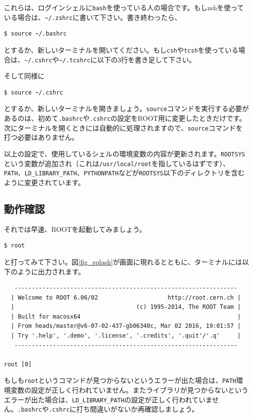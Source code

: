 これらは、ログインシェルに\texttt{bash}を使っている人の場合です。もしzshを使っている場合は、\texttt{\~{}/.zshrc}に書いて下さい。書き終わったら、
\begin{lstlisting}[language=bash]
$ source ~/.bashrc
\end{lstlisting}
とするか、新しいターミナルを開いてください。もし\texttt{csh}や\texttt{tcsh}を使っている場合は、\texttt{\~{}/.cshrc}や\texttt{\~{}/.tcshrc}に以下の3行を書き足して下さい。
\begin{NoFloat}

\end{NoFloat}
そして同様に
\begin{lstlisting}[language=bash]
$ source ~/.cshrc
\end{lstlisting}
とするか、新しいターミナルを開きましょう。\texttt{source}コマンドを実行する必要があるのは、初めて\texttt{.bashrc}や\texttt{.cshrc}の設定をROOT用に変更したときだけです。次にターミナルを開くときには自動的に処理されますので、\texttt{source}コマンドを打つ必要はありません。

以上の設定で、使用しているシェルの環境変数の内容が更新されます。\texttt{ROOTSYS}という変数が追加され（これは\texttt{/usr/local/root}を指しているはずです）、\texttt{PATH}、\texttt{LD\_LIBRARY\_PATH}、\texttt{PYTHONPATH}などが\texttt{ROOTSYS}以下のディレクトリを含むように変更されています。

\subsection{動作確認}

それでは早速、ROOTを起動してみましょう。
\begin{lstlisting}[language=bash]
$ root
\end{lstlisting}
と打ってみて下さい。図\ref{fig_splash}が画面に現れるとともに、ターミナルには以下のように出力されます。
\begin{lstlisting}
   ----------------------------------------------------------------
  | Welcome to ROOT 6.06/02                    http://root.cern.ch |
  |                                   (c) 1995-2014, The ROOT Team |
  | Built for macosx64                                             |
  | From heads/master@v6-07-02-437-gb06340c, Mar 02 2016, 19:01:57 |
  | Try '.help', '.demo', '.license', '.credits', '.quit'/'.q'     |
   ----------------------------------------------------------------

root [0] 
\end{lstlisting}
もしも\texttt{root}というコマンドが見つからないというエラーが出た場合は、\texttt{PATH}環境変数の設定が正しく行われていません。またライブラリが見つからないというエラーが出た場合は、\texttt{LD\_LIBRARY\_PATH}の設定が正しく行われていません。\texttt{.bashrc}や\texttt{.cshrc}に打ち間違いがないか再確認しましょう。

